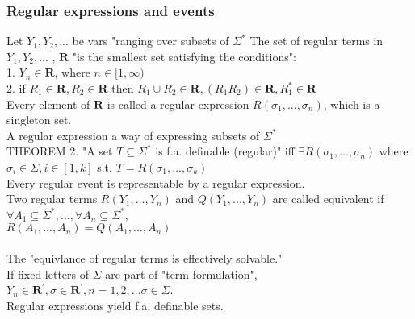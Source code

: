 \subsubsection{Regular expressions and events}
Let $Y_1, Y_2, ...$ be vars "ranging over subsets of $\Sigma^{*}$  The set of regular terms in $Y_1, Y_2, ...$ , $\mathbf{R}$ "is the smallest set satisfying the conditions":\\
1. $Y_n \in \mathbf{R}$, where $n \in [1, \infty)$\\
2. if $R_1 \in \mathbf{R}, R_2 \in \mathbf{R}$ then $R_1 \cup R_2 \in \mathbf{R}, (R_1 R_2) \in \mathbf{R}, R_{1}^{*} \in \mathbf{R}$\\
Every element of $\textbf{R}$ is called a regular expression $R(\sigma_1, ..., \sigma_n)$, which is a singleton set.\\
A regular expression a way of expressing subsets of $\Sigma^*$\\
THEOREM 2. 
"A set $T \subseteq \Sigma^*$ is f.a. definable (regular)" iff $\exists R(\sigma_1, ..., \sigma_n)$ where $\sigma_i \in \Sigma, i \in [1,k]$ s.t. $T = R(\sigma_1, ..., \sigma_k)$\\
Every regular event is representable by a regular expression.\\  
Two regular terms $R(Y_1, ..., Y_n)$ and $Q(Y_1, ..., Y_n)$ are called equivalent if $\forall A_1 \subseteq \Sigma^*, ...,  \forall A_n \subseteq \Sigma^*$,\\
$R(A_1, ..., A_n) = Q(A_1, ..., A_n)$\\
\\
The "equivlance of regular terms is effectively solvable."\\
If fixed letters of $\Sigma$ are part of "term formulation", $Y_n \in \mathbf{R^{'}}, \sigma \in \mathbf{R^{'}}, n = 1,2, ... \sigma \in \Sigma$.\\
Regular expressions yield f.a. definable sets.

